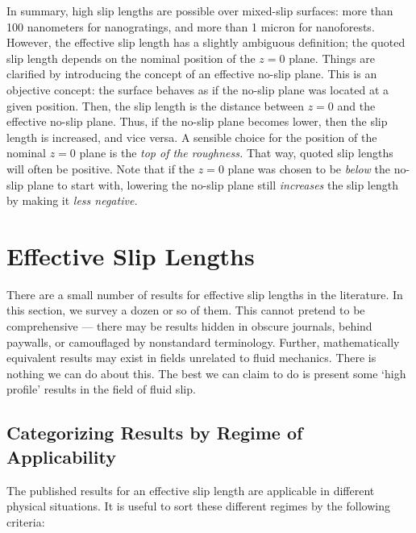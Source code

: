 \documentclass[a4paper]{report}
\begin{document}
In summary, high slip lengths are possible over mixed-slip surfaces: more than 100 nanometers for nanogratings, and more than 1 micron for nanoforests.  However, the effective slip length has a slightly ambiguous definition; the quoted slip length depends on the nominal position of the $z=0$ plane.  Things are clarified by introducing the concept of an effective no-slip plane.  This is an objective concept: the surface behaves as if the no-slip plane was located at a given position.  Then, the slip length is the distance between $z=0$ and the effective no-slip plane.  Thus, if the no-slip plane becomes lower, then the slip length is increased, and vice versa.  A sensible choice for the position of the nominal $z=0$ plane is the \emph{top of the roughness.}  That way, quoted slip lengths will often be positive.  Note that if the $z=0$ plane was chosen to be \emph{below} the no-slip plane to start with, lowering the no-slip plane still \emph{increases} the slip length by making it \emph{less negative.}


\clearpage

\section{Effective Slip Lengths}


There are a small number of results for effective slip lengths in the literature.  In this section, we survey a dozen or so of them.  This cannot pretend to be comprehensive --- there may be results hidden in obscure journals, behind paywalls, or camouflaged by nonstandard terminology.  Further, mathematically equivalent results may exist in fields unrelated to fluid mechanics.  There is nothing we can do about this.  The best we can claim to do is present some `high profile' results in the field of fluid slip.

\subsection*{Categorizing Results by Regime of Applicability}

The published results for an effective slip length are applicable in different physical situations.  It is useful to sort these different regimes by the following criteria:
\end{document}
